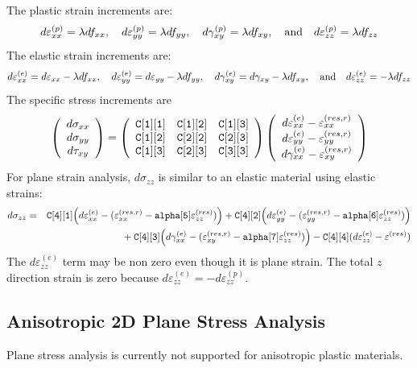 \documentclass[11pt]{article}
\def\code#1{{\small\tt #1}}
\def\e#1{\varepsilon_{#1}}
\def\er#1{\varepsilon_{#1}^{(res)}}
\def\err#1{\varepsilon_{#1}^{(res,r)}}
\def\g#1{\gamma_{#1}}
\def\s#1{\sigma_{#1}}
\def\t#1{\tau_{#1}}
\def\vvec#1#2#3{\left(\begin{array}{ccc} #1 \\ #2 \\ #3 \end{array}\right)}
\begin{document}
 The plastic strain increments are:
\begin{equation}
       d\varepsilon_{xx}^{(p)} = \lambda df_{xx}, \quad
       d\varepsilon_{yy}^{(p)} = \lambda df_{yy}, \quad
       d\gamma_{xy}^{(p)} =  \lambda df_{xy}, \quad  {\rm and} \quad
       d\varepsilon_{zz}^{(p)} = \lambda df_{zz}
\end{equation}
The elastic strain increments are:
\begin{equation}
       d\varepsilon_{xx}^{(e)} = d\varepsilon_{xx} -\lambda df_{xx}, \quad
       d\varepsilon_{yy}^{(e)} = d\varepsilon_{yy} -\lambda df_{yy}, \quad
       d\gamma_{xy}^{(e)} = d\gamma_{xy} -  \lambda df_{xy}, \quad  {\rm and} \quad
       d\varepsilon_{zz}^{(e)} =  -\lambda df_{zz}
\end{equation}
The specific stress increments are
\begin{equation}
      \vvec{d\s{xx}}{d\s{yy}}{d\t{xy}} = \left(\begin{array}{ccc}
      		\code{C[1][1]} & \code{C[1][2]} & \code{C[1][3]}  \\
      		\code{C[1][2]} & \code{C[2][2]} & \code{C[2][3]}  \\
      		\code{C[1][3]} & \code{C[2][3]} & \code{C[3][3]} 
           \end{array}\right)
          \vvec{d\varepsilon_{xx}^{(e)}  - \err{xx}}{d\varepsilon_{yy}^{(e)}  -\err{yy}}{d\g{xx}^{(e)}-\err{xy}}
 \end{equation}
For plane strain analysis, $d\sigma_{zz}$ is similar to an elastic material using elastic strains:
 \begin{eqnarray}
     d\s{zz} & = & \code{C[4][1]} \Bigl(d\e{xx}^{(e)} -(\err{xx}-\code{alpha[5]}\er{zz})\Bigr)
                         +  \code{C[4][2]}\Bigl(d\e{yy}^{(e)} -(\err{yy}-\code{alpha[6]}\er{zz})\Bigr) 
     \nonumber \\
     && \qquad\qquad\mbox{}
                 + \code{C[4][3]}\Bigl(d\g{xx}^{(e)}-(\err{xy}-\code{alpha[7]}\er{zz})\Bigr)  - \code{C[4][4]}(d\e{zz}^{(e)}-\er{})
\end{eqnarray}
The $d\e{zz}^{(e)}$ term may be non zero even though it is plane strain. The total $z$ direction strain is zero because $d\e{zz}^{(e)} = -d\e{zz}^{(p)}$.

\subsection{Anisotropic 2D Plane Stress Analysis}

Plane stress analysis is currently not supported for anisotropic plastic materials.
\end{document}
